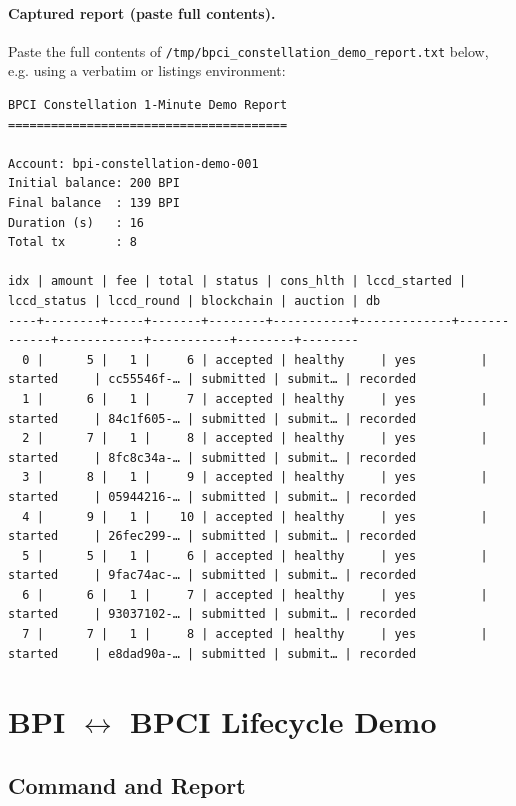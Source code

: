 \paragraph{Captured report (paste full contents).}

Paste the full contents of \texttt{/tmp/bpci_constellation_demo_report.txt} below, e.g. using a verbatim or listings environment:

\begin{lstlisting}
BPCI Constellation 1-Minute Demo Report
=======================================

Account: bpi-constellation-demo-001
Initial balance: 200 BPI
Final balance  : 139 BPI
Duration (s)   : 16
Total tx       : 8

idx | amount | fee | total | status | cons_hlth | lccd_started | lccd_status | lccd_round | blockchain | auction | db
----+--------+-----+-------+--------+-----------+-------------+-------------+------------+-----------+--------+--------
  0 |      5 |   1 |     6 | accepted | healthy     | yes         | started     | cc55546f-… | submitted | submit… | recorded
  1 |      6 |   1 |     7 | accepted | healthy     | yes         | started     | 84c1f605-… | submitted | submit… | recorded
  2 |      7 |   1 |     8 | accepted | healthy     | yes         | started     | 8fc8c34a-… | submitted | submit… | recorded
  3 |      8 |   1 |     9 | accepted | healthy     | yes         | started     | 05944216-… | submitted | submit… | recorded
  4 |      9 |   1 |    10 | accepted | healthy     | yes         | started     | 26fec299-… | submitted | submit… | recorded
  5 |      5 |   1 |     6 | accepted | healthy     | yes         | started     | 9fac74ac-… | submitted | submit… | recorded
  6 |      6 |   1 |     7 | accepted | healthy     | yes         | started     | 93037102-… | submitted | submit… | recorded
  7 |      7 |   1 |     8 | accepted | healthy     | yes         | started     | e8dad90a-… | submitted | submit… | recorded
\end{lstlisting}

\section{BPI \texorpdfstring{$\leftrightarrow$}{<->} BPCI Lifecycle Demo}

\subsection{Command and Report}

